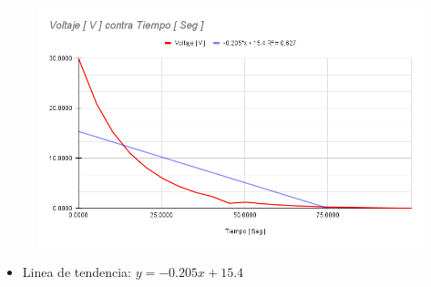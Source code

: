 \documentclass[twocolumn, 12pt]{article}
\begin{document}
\begin{figure}[H]
    \centering
    \includegraphics[width=\linewidth]{./Images/Voltaje [ V ] contra Tiempo [ Seg ] Descarga.png}
\end{figure}

\begin{itemize}[label=$\triangleright$]
    \item Linea de tendencia:\hfill \break{} $y= -0.205x + 15.4$
\end{itemize}
\end{document}
